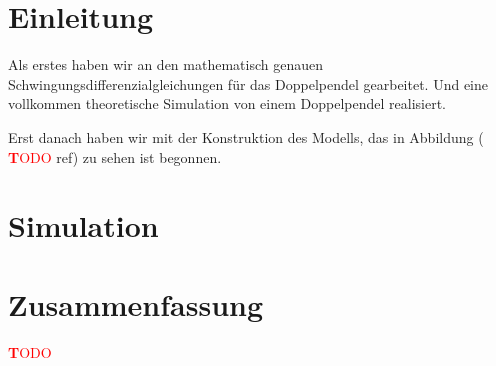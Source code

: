 \documentclass[a4paper, 10pt]{article}
\title{\mytitle}
\author{\myauthor}
\newcommand{\TODO}{\textcolor{red}{ \textbf TODO }}
\begin{document}
\maketitle
\begin{abstract}
In unserem Projekt beschäftigen wir uns mit dem Verhalten von chaotischen Doppelpendeln. Wir wollen aus der aktuellen Bewegung eines Doppelpendels den weiteren Bewegungsablauf in einem kurzen Zeitintervall extrapolieren und dann versuchen, diese Bewegung zu beeinflussen.

Hierzu wollen wir zunächst ein Doppelpendel konstruieren, bei dem Daten über den aktuellen Bewegungszustand erfasst werden können. Diese Daten sollen in Echtzeit von einem Computer ausgewertet werden, um laufend eine Prognose an die Messwerte anzupassen. Anhand dieser Prognose soll dann entschieden werden, ob das Pendel eine unerwünschte Bewegung durchführen wird, und wenn nötig, soll mithilfe mehrerer Spulen eine korrigierende magnetische Kraft erzeugt werden. Es könnte zum Beispiel erwünscht sein, einen Überschlag zu vermeiden.
\end{abstract}

\clearpage
\pagestyle{fancy}
\tableofcontents

\clearpage

\section{Einleitung}
Als erstes haben wir an den mathematisch genauen Schwingungsdifferenzialgleichungen für das Doppelpendel gearbeitet.
Und eine vollkommen theoretische Simulation von einem Doppelpendel realisiert.

Erst danach haben wir mit der Konstruktion des Modells, das in Abbildung (\TODO ref) zu sehen ist begonnen.

\section{Simulation}


\clearpage


\section{Zusammenfassung}
\TODO

\clearpage
{}

{}
\end{document}
